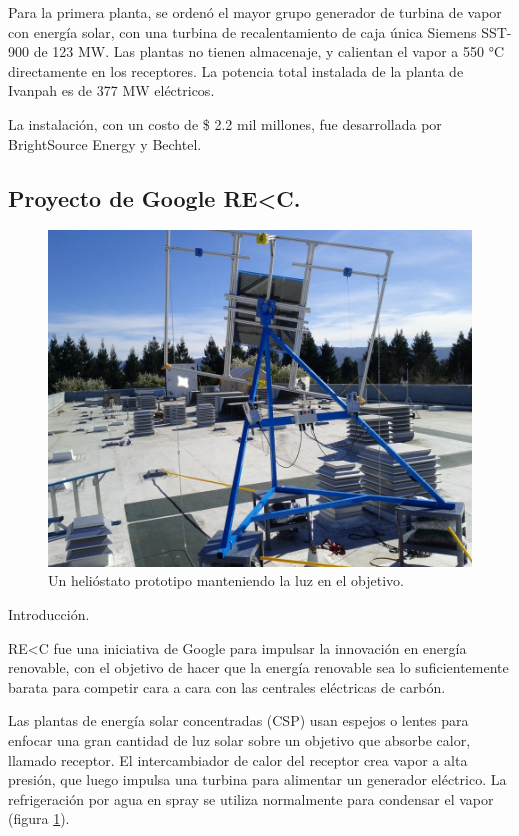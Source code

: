 Para la primera planta, se ordenó el mayor grupo generador de turbina de vapor con energía solar, con una turbina de recalentamiento de caja única Siemens SST-900 de 123 MW. Las plantas no tienen almacenaje, y calientan el vapor a 550 °C directamente en los receptores. La potencia total instalada de la planta de Ivanpah es de 377 MW eléctricos.
 
La instalación, con un costo de \$ 2.2 mil millones, fue desarrollada por BrightSource Energy y Bechtel. \cite{Wikipedia2WebSite}



\subsection{Proyecto de Google RE\textless C.}

\begin{figure}[h!]
  	\centering
	\includegraphics[scale=1]{FotosPaginasWebHeliostatos/HeliostatoGoogle.png}
	\caption{Un helióstato prototipo manteniendo la luz en el objetivo.~\cite{Wikipedia3WebSite}
	\label{fig:FotosPaginasWebHeliostatos/HeliostatoGoogle.png}}
\end{figure} 

Introducción.

RE\textless C fue una iniciativa de Google para impulsar la innovación en energía renovable, con el objetivo de hacer que la energía renovable sea lo suficientemente barata para competir cara a cara con las centrales eléctricas de carbón.

Las plantas de energía solar concentradas (CSP) usan espejos o lentes para enfocar una gran cantidad de luz solar sobre un objetivo que absorbe calor, llamado receptor. El intercambiador de calor del receptor crea vapor a alta presión, que luego impulsa una turbina para alimentar un generador eléctrico. La refrigeración por agua en spray se utiliza normalmente para condensar el vapor (figura \ref{fig:FotosPaginasWebHeliostatos/HeliostatoGoogle.png}).

